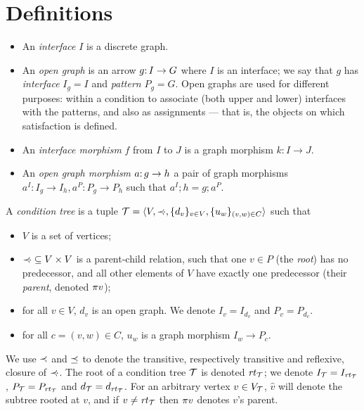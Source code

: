 \section{Definitions}
\label{sec:definitions}

\begin{itemize}
\item An \emph{interface} $I$ is a discrete graph.

\item An \emph{open graph} is an arrow $g{:}\, I\rightarrow G$ where $I$ is an interface; we say that $g$ has \emph{interface} $I_g=I$ and \emph{pattern} $P_g=G$. Open graphs are used for different purposes: within a condition to associate (both upper and lower) interfaces with the patterns, and also as assignments --- that is, the objects on which satisfaction is defined.

\item An \emph{interface morphism} $f$ from $I$ to $J$ is a graph morphism $k:I\to J$.

\item An \emph{open graph morphism} $a{:}\, g\rightarrow h$ a pair of graph morphisms $a^I:I_g\to I_h, a^P:P_g\to P_h$ such that $a^I;h=g;a^P$.
\end{itemize}
%
\begin{definition}\label{def:condition tree}
A \emph{condition tree} is a tuple ${\mathcal{T}}=\langle V, {\mathrel{\prec\mskip-8mu\cdot}}, \{{d_v}\}_{v\in V}, \{{u_w}\}_{(v,w)\in C}\rangle$ such that

\begin{itemize}[topsep=\smallskipamount]
\item $V$ is a set of vertices;

\item ${\mathrel{\prec\mskip-8mu\cdot}}\subseteq V\times V$ is a parent-child relation, such that one $v\in P$ (the \emph{root}) has no predecessor, and all other elements of $V$ have exactly one predecessor (their \emph{parent}, denoted $\pi{v}$);

\item for all $v\in V$, $d_v$ is an open graph. We denote $I_v=I_{d_v}$ and $P_v=P_{d_v}$.

\item for all $c=(v,w)\in C$, $u_w$ is a graph morphism $I_w\to P_c$.
\end{itemize}
\end{definition}
%
We use $\prec$ and $\preceq$ to denote the transitive, respectively transitive and reflexive, closure of $\mathrel{\prec\mskip-8mu\cdot}$. The root of a condition tree ${\mathcal{T}}$ is denoted $\mathit{rt}_{{\mathcal{T}}}$; we denote $I_{\mathcal{T}}=I_{\mathit{rt}_{{\mathcal{T}}}}$, $P_{\mathcal{T}}=P_{\mathit{rt}_{{\mathcal{T}}}}$ and $d_{\mathcal{T}}=d_{\mathit{rt}_{{\mathcal{T}}}}$. For an arbitrary vertex $v\in V_{\mathcal{T}}$, $\hat v$ will denote the subtree rooted at $v$, and if $v\neq\mathit{rt}_{{\mathcal{T}}}$ then $\pi{v}$ denotes $v$'s parent.

